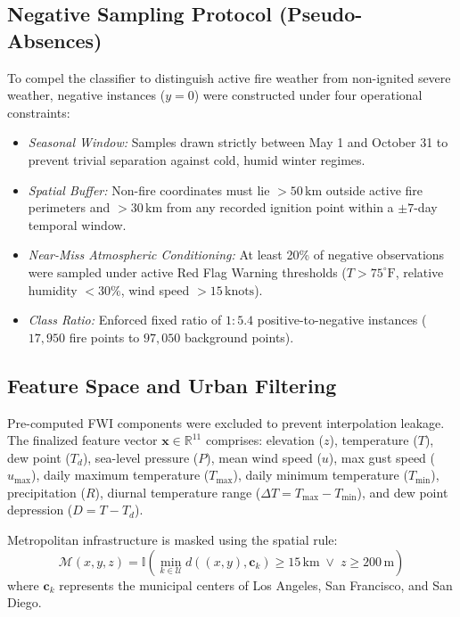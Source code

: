 \documentclass[journal]{IEEEtran}
\begin{document}
\subsection{Negative Sampling Protocol (Pseudo-Absences)}
To compel the classifier to distinguish active fire weather from non-ignited severe weather, negative instances ($y=0$) were constructed under four operational constraints:
\begin{itemize}
    \item \emph{Seasonal Window:} Samples drawn strictly between May 1 and October 31 to prevent trivial separation against cold, humid winter regimes.
    \item \emph{Spatial Buffer:} Non-fire coordinates must lie $>50\,\text{km}$ outside active fire perimeters and $>30\,\text{km}$ from any recorded ignition point within a $\pm 7$-day temporal window.
    \item \emph{Near-Miss Atmospheric Conditioning:} At least 20\% of negative observations were sampled under active Red Flag Warning thresholds ($T > 75^\circ\text{F}$, relative humidity $<30\%$, wind speed $>15\,\text{knots}$).
    \item \emph{Class Ratio:} Enforced fixed ratio of $1:5.4$ positive-to-negative instances ($17,950$ fire points to $97,050$ background points).
\end{itemize}

\subsection{Feature Space and Urban Filtering}
Pre-computed FWI components were excluded to prevent interpolation leakage. The finalized feature vector $\mathbf{x} \in \mathbb{R}^{11}$ comprises: elevation ($z$), temperature ($T$), dew point ($T_d$), sea-level pressure ($P$), mean wind speed ($u$), max gust speed ($u_{\max}$), daily maximum temperature ($T_{\max}$), daily minimum temperature ($T_{\min}$), precipitation ($R$), diurnal temperature range ($\Delta T = T_{\max} - T_{\min}$), and dew point depression ($D = T - T_d$).

Metropolitan infrastructure is masked using the spatial rule:
\begin{equation}
    \mathcal{M}(x, y, z) = \mathbb{I}\left( \min_{k \in \mathcal{U}} d((x, y), \mathbf{c}_k) \ge 15\,\text{km} \;\lor\; z \ge 200\,\text{m} \right)
\end{equation}
where $\mathbf{c}_k$ represents the municipal centers of Los Angeles, San Francisco, and San Diego.
\end{document}
